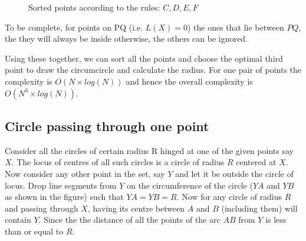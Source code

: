 \documentclass{article}
\begin{document}
        \begin{figure}
            \centering
            \caption {Sorted points according to the rules: $C, D, E, F$}
        \end{figure}

        To be complete, for points on PQ (i.e. $L(X) = 0$) the ones that lie between $PQ$, the they will always be inside otherwise, the others can be ignored.

        Using these together, we can sort all the points and choose the optimal third point to draw the circumcircle and calculate the radius. For one pair of points the complexity is $O(N \times log(N))$ and hence the overall complexity is $O(N^3 \times log(N))$.

        \subsection{Circle passing through one point}

        Consider all the circles of certain radius R hinged at one of the given points say $X$. The locus of centres of all such circles is a circle of radius $R$ centered at $X$. Now consider any other point in the set, say $Y$ and let it be outside the circle of locus. Drop line segments from $Y$ on the circumference of the circle ($YA$ and $YB$ as shown in the figure) such that $YA = YB = R$. Now for any circle of radius $R$ and passing through $X$, having its centre between $A$ and $B$ (including them) will contain $Y$. Since the the distance of all the points of the arc $AB$ from $Y$ is less than or equal to $R$. \\
\end{document}
